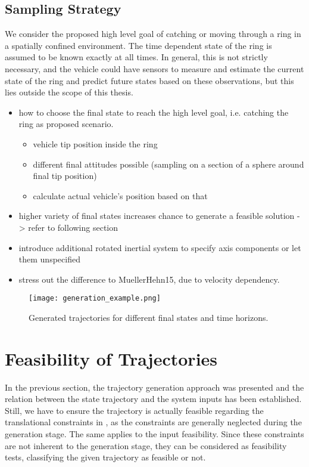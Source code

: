 \subsection{Sampling Strategy}
\label{sec:sampling-strategy}
We consider the proposed high level goal of catching or moving through a ring in a spatially confined environment. The time dependent state of the ring is assumed to be known exactly at all times. In general, this is not strictly necessary, and the vehicle could have sensors to measure and estimate the current state of the ring and predict future states based on these observations, but this lies outside the scope of this thesis.


\begin{itemize}
	\color{red}
	\item how to choose the final state to reach the high level goal, i.e. catching the ring as proposed scenario.
	\begin{itemize}
		\item vehicle tip position inside the ring
		\item different final attitudes possible (sampling on a section of a sphere around final tip position)
		\item calculate actual vehicle's position based on that
	\end{itemize}
	\item higher variety of final states increases chance to generate a feasible solution -> refer to following section
	\item introduce additional rotated inertial system to specify axis components or let them unspecified
	\item stress out the difference to MuellerHehn15, due to velocity dependency.
\end{itemize}
\begin{figure}[h!]
	\centering
	\texttt{[image: generation\_example.png]}
	\caption{Generated trajectories for different final states and time horizons.}
\end{figure}
\section{Feasibility of Trajectories}
\label{sec:feasibility}
In the previous section, the trajectory generation approach was presented and the relation between the state trajectory and the system inputs has been established.
Still, we have to ensure the trajectory is actually feasible regarding the translational constraints in , as the constraints are generally neglected during the generation stage.
The same applies to the input feasibility.
Since these constraints are not inherent to the generation stage, they can be considered as feasibility tests, classifying the given trajectory as feasible or not. 

